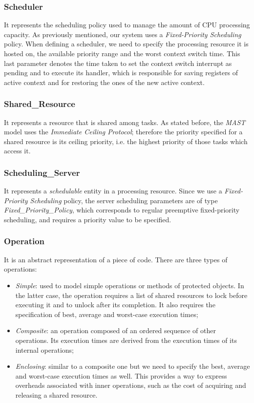 \subsubsection{Scheduler}
It represents the scheduling policy used to manage the amount of CPU processing
capacity. As previously mentioned, our system uses a \textit{Fixed-Priority
Scheduling} policy. When defining a scheduler, we need to specify the processing
resource it is hosted on, the available priority range and the worst context
switch time. This last parameter denotes the time taken to set 
the context switch interrupt as pending and to execute its handler, which is
responsible for saving registers of active context and for restoring the ones of
the new active context.

\subsubsection{Shared\_Resource}
It represents a resource that is shared among tasks. As stated before, the
\textit{MAST} model uses the \textit{Immediate Ceiling Protocol}; therefore the
priority specified for a shared resource is its ceiling priority, i.e. the
highest priority of those tasks which access it.

\subsubsection{Scheduling\_Server}
It represents a \textit{schedulable} entity in a processing resource. Since we use a
\textit{Fixed-Priority Scheduling} policy, the server scheduling parameters are
of type \textit{Fixed\_Priority\_Policy}, which corresponds to regular preemptive
fixed-priority scheduling, and requires a priority value to be specified.

\subsubsection{Operation}
It is an abstract representation of a piece of code. There are three types of
operations:
\begin{itemize}
    \item \textit{Simple}: used to model simple operations or methods of
    protected objects. In the latter case, the operation requires a list of
    shared resources to lock before executing it and to unlock after its
    completion. It also requires the specification of best, average and worst-case
    execution times;
    \item \textit{Composite}: an operation composed of an ordered sequence of
    other operations. Its execution times are derived from the execution times
    of its internal operations;
    \item \textit{Enclosing}: similar to a composite one but we need to specify
    the best, average and worst-case execution times as well. This provides a
    way to express overheads associated with inner operations, such as the cost
    of acquiring and releasing a shared resource. 
\end{itemize}


